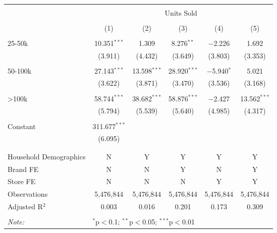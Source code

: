 
\begin{table}[!htbp] \centering 
  \caption{} 
  \label{} 
\begin{tabular}{@{\extracolsep{5pt}}lccccc} 
\\[-1.8ex]\hline 
\hline \\[-1.8ex] 
 & \multicolumn{5}{c}{Units Sold} \\ 
\cline{2-6} 
\\[-1.8ex] & (1) & (2) & (3) & (4) & (5)\\ 
\hline \\[-1.8ex] 
 25-50k & 10.351$^{***}$ & 1.309 & 8.276$^{**}$ & $-$2.226 & 1.692 \\ 
  & (3.911) & (4.432) & (3.649) & (3.803) & (3.353) \\ 
  & & & & & \\ 
 50-100k & 27.143$^{***}$ & 13.598$^{***}$ & 28.920$^{***}$ & $-$5.940$^{*}$ & 5.021 \\ 
  & (3.622) & (3.871) & (3.470) & (3.536) & (3.168) \\ 
  & & & & & \\ 
 >100k & 58.744$^{***}$ & 38.682$^{***}$ & 58.876$^{***}$ & $-$2.427 & 13.562$^{***}$ \\ 
  & (5.794) & (5.539) & (5.640) & (4.985) & (4.317) \\ 
  & & & & & \\ 
 Constant & 311.677$^{***}$ &  &  &  &  \\ 
  & (6.095) &  &  &  &  \\ 
  & & & & & \\ 
\hline \\[-1.8ex] 
Household Demographics & N & Y & Y & Y & Y \\ 
Brand FE & N & N & Y & N & Y \\ 
Store FE & N & N & N & Y & Y \\ 
Observations & 5,476,844 & 5,476,844 & 5,476,844 & 5,476,844 & 5,476,844 \\ 
Adjusted R$^{2}$ & 0.003 & 0.016 & 0.201 & 0.173 & 0.309 \\ 
\hline 
\hline \\[-1.8ex] 
\textit{Note:}  & \multicolumn{5}{l}{$^{*}$p$<$0.1; $^{**}$p$<$0.05; $^{***}$p$<$0.01} \\ 
\end{tabular} 
\end{table} 
